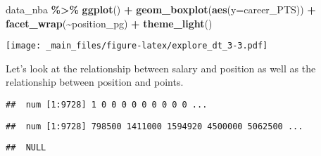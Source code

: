 \documentclass[
]{book}
\newenvironment{Shaded}{\begin{snugshade}}{\end{snugshade}}
\newcommand{\AttributeTok}[1]{\textcolor[rgb]{0.13,0.29,0.53}{#1}}
\newcommand{\FunctionTok}[1]{\textcolor[rgb]{0.13,0.29,0.53}{\textbf{#1}}}
\newcommand{\NormalTok}[1]{#1}
\newcommand{\SpecialCharTok}[1]{\textcolor[rgb]{0.81,0.36,0.00}{\textbf{#1}}}
\begin{document}
\begin{Shaded}
\begin{Highlighting}[]
\NormalTok{data\_nba }\SpecialCharTok{\%\textgreater{}\%} \FunctionTok{ggplot}\NormalTok{() }\SpecialCharTok{+} 
\FunctionTok{geom\_boxplot}\NormalTok{(}\FunctionTok{aes}\NormalTok{(}\AttributeTok{y=}\NormalTok{career\_PTS)) }\SpecialCharTok{+}
  \FunctionTok{facet\_wrap}\NormalTok{(}\SpecialCharTok{\textasciitilde{}}\NormalTok{position\_pg) }\SpecialCharTok{+}
  \FunctionTok{theme\_light}\NormalTok{()}
\end{Highlighting}
\end{Shaded}

\texttt{[image: \_main\_files/figure-latex/explore\_dt\_3-3.pdf]}

Let's look at the relationship between salary and position as well as the
relationship between position and points.

\begin{Shaded}
\end{Shaded}

\begin{verbatim}
##  num [1:9728] 1 0 0 0 0 0 0 0 0 0 ...
\end{verbatim}

\begin{Shaded}
\end{Shaded}

\begin{verbatim}
##  num [1:9728] 798500 1411000 1594920 4500000 5062500 ...
\end{verbatim}

\begin{Shaded}
\end{Shaded}

\begin{verbatim}
##  NULL
\end{verbatim}
\end{document}
